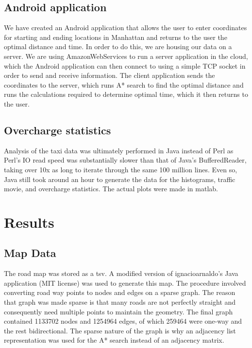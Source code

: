 \documentclass{sig-alternate}
\begin{document}
\subsection{Android application}
        	We have created an Android application that allows the user to enter coordinates for starting and ending locations in Manhattan and returns to the user the optimal distance and time.  In order to do this, we are housing our data on a server.  We are using AmazonWebServices to run a server application in the cloud, which the Android application can then connect to using a simple TCP socket in order to send and receive information.  The client application sends the coordinates to the server, which runs A* search to find the optimal distance and runs the calculations required to determine optimal time, which it then returns to the user.

\subsection{Overcharge statistics}
Analysis of the taxi data was ultimately performed in Java instead of Perl as Perl's IO read speed was substantially slower than that of Java's BufferedReader, taking over 10x as long to iterate through the same 100 million lines. Even so, Java still took around an hour to generate the data for the histograms, traffic movie, and overcharge statistics. The actual plots were made in matlab.

\section{Results}

\subsection{Map Data}
The road map was stored as a tsv. A modified version of ignacioarnaldo's Java application (MIT license) was used to generate this map. The procedure involved converting road way points to nodes and edges on a sparse graph. The reason that graph was made sparse is that many roads are not perfectly straight and consequently need multiple points to maintain the geometry. The final graph contained 1133702 nodes and 1254964 edges, of which 259464 were one-way and the rest bidirectional. The sparse nature of the graph is why an adjacency list representation was used for the A* search instead of an adjacency matrix.
\end{document}
